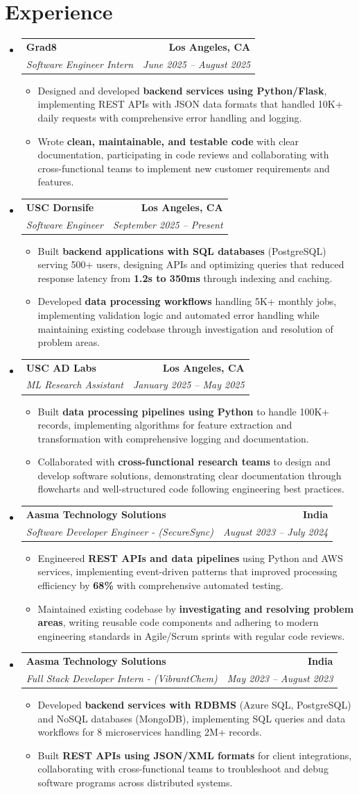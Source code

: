 \documentclass[letterpaper,10pt]{article}
\makeatletter
\newcommand{\resumeItem}[1]{\item\small{{#1 \vspace{-2pt}}}}
\newcommand{\resumeSubheading}[4]{\vspace{-1pt}\item\begin{tabular*}{1.0\textwidth}[t]{l@{\extracolsep{\fill}}r}\textbf{#1} & \textbf{\small #2} \\\textit{\small#3} & \textit{\small #4} \\\end{tabular*}\vspace{-2pt}}
\newcommand{\resumeSubHeadingListStart}{\begin{itemize}[leftmargin=0.0in, label={}]}
\newcommand{\resumeSubHeadingListEnd}{\end{itemize}}
\newcommand{\resumeItemListStart}{\begin{itemize}[leftmargin=0.15in,label=\textbullet,itemsep=2pt,topsep=0pt,parsep=0pt,partopsep=0pt]}
\newcommand{\resumeItemListEnd}{\end{itemize}\vspace{-4pt}}
\makeatother
\begin{document}
\section{Experience}
\resumeSubHeadingListStart
\resumeSubheading{Grad8}{Los Angeles, CA}{Software Engineer Intern}{June 2025 -- August 2025}
\resumeItemListStart
\resumeItem{Designed and developed \textbf{backend services using Python/Flask}, implementing REST APIs with JSON data formats that handled 10K+ daily requests with comprehensive error handling and logging.}
\resumeItem{Wrote \textbf{clean, maintainable, and testable code} with clear documentation, participating in code reviews and collaborating with cross-functional teams to implement new customer requirements and features.}
\resumeItemListEnd
\resumeSubheading{USC Dornsife}{Los Angeles, CA}{Software Engineer}{September 2025 -- Present}
\resumeItemListStart
\resumeItem{Built \textbf{backend applications with SQL databases} (PostgreSQL) serving 500+ users, designing APIs and optimizing queries that reduced response latency from \textbf{1.2s to 350ms} through indexing and caching.}
\resumeItem{Developed \textbf{data processing workflows} handling 5K+ monthly jobs, implementing validation logic and automated error handling while maintaining existing codebase through investigation and resolution of problem areas.}
\resumeItemListEnd
\resumeSubheading{USC AD Labs}{Los Angeles, CA}{ML Research Assistant}{January 2025 -- May 2025}
\resumeItemListStart
\resumeItem{Built \textbf{data processing pipelines using Python} to handle 100K+ records, implementing algorithms for feature extraction and transformation with comprehensive logging and documentation.}
\resumeItem{Collaborated with \textbf{cross-functional research teams} to design and develop software solutions, demonstrating clear documentation through flowcharts and well-structured code following engineering best practices.}
\resumeItemListEnd
\resumeSubheading{Aasma Technology Solutions}{India}{Software Developer Engineer - (SecureSync)}{August 2023 -- July 2024}
\resumeItemListStart
\resumeItem{Engineered \textbf{REST APIs and data pipelines} using Python and AWS services, implementing event-driven patterns that improved processing efficiency by \textbf{68\%} with comprehensive automated testing.}
\resumeItem{Maintained existing codebase by \textbf{investigating and resolving problem areas}, writing reusable code components and adhering to modern engineering standards in Agile/Scrum sprints with regular code reviews.}
\resumeItemListEnd
\resumeSubheading{Aasma Technology Solutions}{India}{Full Stack Developer Intern - (VibrantChem)}{May 2023 -- August 2023}
\resumeItemListStart
\resumeItem{Developed \textbf{backend services with RDBMS} (Azure SQL, PostgreSQL) and NoSQL databases (MongoDB), implementing SQL queries and data workflows for 8 microservices handling 2M+ records.}
\resumeItem{Built \textbf{REST APIs using JSON/XML formats} for client integrations, collaborating with cross-functional teams to troubleshoot and debug software programs across distributed systems.}
\resumeItemListEnd
\resumeSubHeadingListEnd
\vspace{-14pt}
\end{document}
